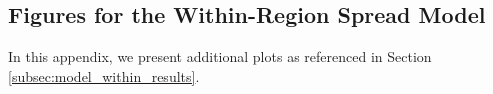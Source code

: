 \documentclass[12pt]{article}
\begin{document}
\begin{appendices}
    	
		
		
		\newpage
		
		
		\subsection{Figures for the Within-Region Spread Model} \label{sapp:figures_model_within}
		In this appendix, we present additional plots as referenced in Section \ref{subsec:model_within_results}.
		

\end{appendices}
\end{document}
